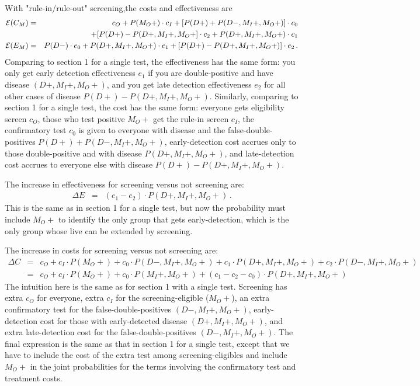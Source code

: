 \documentclass[11pt]{article}
\begin{document}
\noindent With "rule-in/rule-out" screening,the costs and effectiveness are
\begin{eqnarray*}
	{\cal E} (C_M) &=& c_O + P(M_O+)\cdot c_I + [P(D+)+P(D-,M_I+,M_O+)]\cdot c_0 \\
	               &&+[P(D+)-P(D+,M_I+,M_O+]\cdot c_2+P(D+,M_I+,M_O+)\cdot c_1\\
	{\cal E} (E_M) &=& P(D-)\cdot e_0 + P(D+,M_I+,M_O+)\cdot e_1 + [P(D+)-P(D+,M_I+,M_O+)]\cdot e_2 \,.
\end{eqnarray*}
Comparing to section 1 for a single test, the effectiveness has the same form: you only get early detection effectiveness $e_1$ if you are double-positive and have disease $(D+,M_I+,M_O+)$, and you get late detection effectiveness $e_2$ for all other cases of disease $P(D+)-P(D+,M_I+,M_O+)$.  Similarly, comparing to section 1 for a single test, the cost has the same form: everyone gets eligibility screen $c_O$, those who test positive $M_O+$ get the rule-in screen $c_I$, the confirmatory test $c_0$ is given to everyone with disease and the false-double-positives $P(D+)+P(D-,M_I+,M_O+)$, early-detection cost accrues only to those double-positive and with disease $P(D+,M_I+,M_O+)$, and late-detection cost accrues to everyone else with disease $P(D+)-P(D+,M_I+,M_O+)$.

The increase in effectiveness for screening versus not screening are:
\begin{eqnarray*}
	\Delta E &=& (e_1 - e_2)\cdot P(D+,M_I+,M_O+)\,.
\end{eqnarray*}
This is the same as in section 1 for a single test, but now the probability must include $M_O+$ to identify the only group that gets early-detection, which is the only group whose live can be extended by screening.

The increase in costs for screening versus not screening are:
\begin{eqnarray*}
	\Delta C &=& c_O + c_I\cdot P(M_O+) + c_0\cdot P(D-,M_I+,M_O+) + c_1\cdot P(D+,M_I+,M_O+) + c_2\cdot P(D-,M_I+,M_O+)\\
	         &=& c_O + c_I\cdot P(M_O+) + c_0\cdot P(M_I+,M_O+) + (c_1 - c_2 - c_0)\cdot P(D+,M_I+,M_O+)
\end{eqnarray*}
The intuition here is the same as for section 1 with a single test.  Screening has extra $c_O$ for everyone, extra $c_I$ for the screening-eligible ($M_O+$), an extra confirmatory test for the false-double-positives $(D-,M_I+,M_O+)$, early-detection cost for those with early-detected disease $(D+,M_I+,M_O+)$, and extra late-detection cost for the false-double-positives $(D-,M_I+,M_O+)$.  The final expression is the same as that in section 1 for a single test, except that we have to include the cost of the extra test among screening-eligibles and include $M_O+$ in the joint probabilities for the terms involving the confirmatory test and treatment costs.
\end{document}
